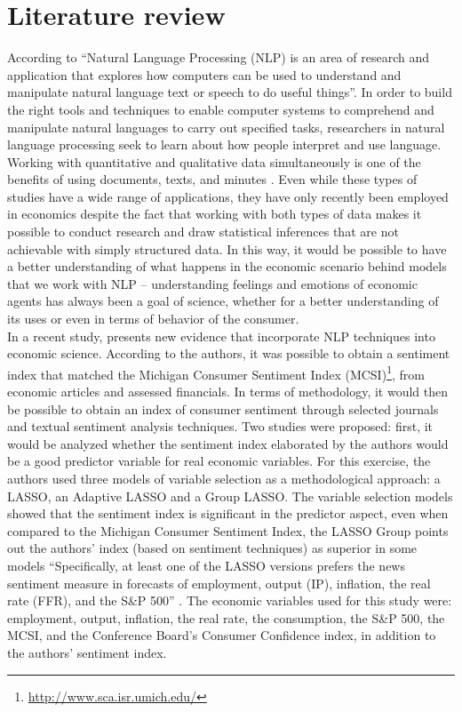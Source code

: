 \chapter{\textbf{Literature review}}  \label{chapter:lit}

According to \cite{chowdhury2003} ``Natural Language Processing (NLP) is an area of research and application that explores how computers can be used to understand and manipulate natural language text or speech to do useful things''. In order to build the right tools and techniques to enable computer systems to comprehend and manipulate natural languages to carry out specified tasks, researchers in natural language processing seek to learn about how people interpret and use language.\\

Working with quantitative and qualitative data simultaneously is one of the benefits of using documents, texts, and minutes \cite[p. 1]{bholat2015text}. Even while these types of studies have a wide range of applications, they have only recently been employed in economics despite the fact that working with both types of data makes it possible to conduct research and draw statistical inferences that are not achievable with simply structured data. In this way, it would be possible to have a better understanding of what happens in the economic scenario behind models that we work with NLP -- understanding feelings and emotions of economic agents has always been a goal of science, whether for a better understanding of its uses or even in terms of behavior of the consumer.\\

In a recent study, \cite{shapiro2020measuring} presents new evidence that incorporate NLP techniques into economic science. According to the authors, it was possible to obtain a sentiment index that matched the Michigan Consumer Sentiment Index (MCSI)\footnote{\url{http://www.sca.isr.umich.edu/}}, from economic articles and assessed financials. In terms of methodology, it would then be possible to obtain an index of consumer sentiment through selected journals and textual sentiment analysis techniques. Two studies were proposed: first, it would be analyzed whether the sentiment index elaborated by the authors would be a good predictor variable for real economic variables. For this exercise, the authors used three models of variable selection as a methodological approach: a LASSO, an Adaptive LASSO and a Group LASSO. The variable selection models showed that the sentiment index is significant in the predictor aspect, even when compared to the Michigan Consumer Sentiment Index, the LASSO Group points out the authors' index (based on sentiment techniques) as superior in some models ``Specifically, at least one of the LASSO versions prefers the news sentiment measure in forecasts of employment, output (IP), inflation, the real rate (FFR), and the S\&P 500'' \cite[p. 26]{shapiro2020measuring}. The economic variables used for this study were: employment, output, inflation, the real rate, the consumption, the S\&P 500, the MCSI, and the Conference Board's Consumer Confidence index, in addition to the authors' sentiment index.\\

